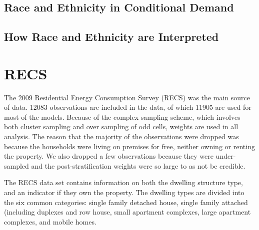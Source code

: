 \documentclass{article}
\begin{document}
% 





  \subsection{Race and Ethnicity in Conditional Demand}
  
  \subsection{How Race and Ethnicity are Interpreted}

\section{RECS}

The 2009 Residential Energy Consumption Survey (RECS) was the main source of data. 12083 observations are included in the data, of which 11905 are used for most of the models. Because of the complex sampling scheme, which involves both cluster sampling and over sampling of odd cells, weights are used in all analysis.  The reason that the majority of the observations were dropped was because the households were living on premises for free, neither owning or renting the property.  We also dropped a few observations because they were under-sampled and the post-stratification weights  were so large to as not be credible.


The RECS data set contains information on both the dwelling structure type,  and an indicator if they own the property.  The dwelling types are divided into the six common categories: single family detached house, single family attached (including duplexes and row house, small apartment complexes, large apartment complexes, and mobile homes. 
\end{document}
